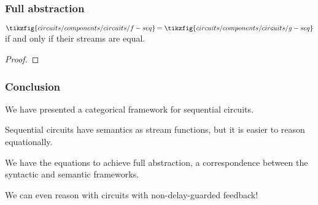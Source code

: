 \begin{frame}
    \frametitle{Full abstraction}

    \begin{theorem}[]
        \(
            \tikzfig{circuits/components/circuits/f-seq} = \tikzfig{circuits/components/circuits/g-seq}
        \)
        if and only if their streams are equal.
    \end{theorem}
    \begin{proof}
    \end{proof}
\end{frame}

\begin{frame}
    \frametitle{Conclusion}

    We have presented a \alert{categorical framework} for sequential circuits.

    \wait

    Sequential circuits have semantics as \alert{stream functions}, but it is easier to reason \alert{equationally}.

    \wait

    We have the equations to achieve \alert{full abstraction}, a correspondence between the syntactic and semantic frameworks.

    \wait

    We can even reason with circuits with \alert{non-delay-guarded feedback}!

\end{frame}